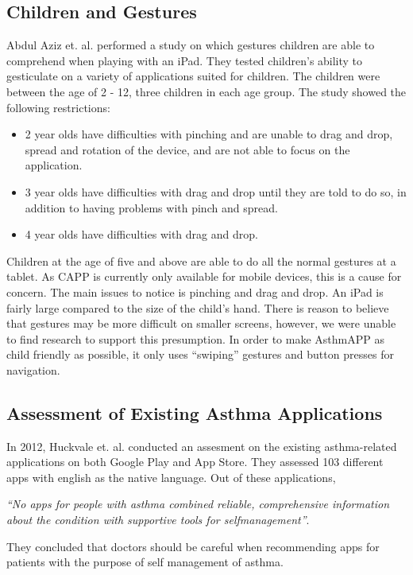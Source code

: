 \subsection{Children and Gestures}
\label{sec:childrenandgestures}
Abdul Aziz et. al.\cite{aziz2013children} performed a study on which gestures children are able to comprehend when playing with an iPad. They tested children's ability to gesticulate on a variety of applications suited for children. The children were between the age of 2 - 12, three children in each age group. The study showed the following restrictions:

\begin{itemize}
  \item 2 year olds have difficulties with pinching and are unable to drag and drop, spread and rotation of the device, and are not able to focus on the application. 
  \item 3 year olds have difficulties with drag and drop until they are told to do so, in addition to having problems with pinch and spread. 
  \item 4 year olds have difficulties with drag and drop. 
\end{itemize}
Children at the age of five and above are able to do all the normal gestures at a tablet. As CAPP is currently only available for mobile devices, this is a cause for concern. The main issues to notice is pinching and drag and drop. An iPad is fairly large compared to the size of the child's hand. There is reason to believe that gestures may be more difficult on smaller screens, however, we were unable to find research to support this presumption. In order to make AsthmAPP as child friendly as possible, it only uses ``swiping'' gestures and button presses for navigation.

\subsection{Assessment of Existing Asthma Applications}
In 2012, Huckvale et. al.\cite{huckvale2012apps} conducted an assesment on the existing asthma-related applications on both Google Play and App Store. They assessed 103 different apps with english as the native language. Out of these applications, 


\emph{``No apps for people with asthma combined reliable, comprehensive information about the condition with supportive tools for self­management''}\cite{huckvale2012apps}. 


They concluded that doctors should be careful when recommending apps for patients with the purpose of self management of asthma.